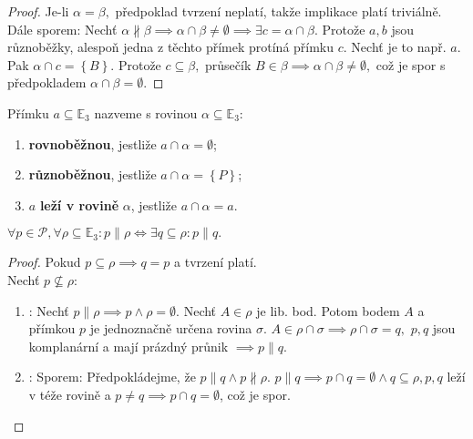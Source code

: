 \begin{proof}
    Je-li $\alpha = \beta,$ předpoklad tvrzení neplatí, takže implikace platí
    triviálně. \\
    Dále sporem: Nechť $\alpha \nparallel \beta \implies \alpha \cap \beta \ne
    \emptyset \implies \exists c = \alpha \cap \beta.$ Protože $a,b$ jsou různoběžky,
    alespoň jedna z těchto přímek protíná přímku $c.$ Nechť je to např. $a.$ Pak
    $\alpha \cap c = \left \{ B \right \} .$ Protože $c\subseteq \beta,$ průsečík
    $B\in \beta \implies \alpha \cap \beta \ne \emptyset,$ což je spor s předpokladem
    $\alpha \cap \beta = \emptyset.$
\end{proof}

\begin{definition}
    Přímku $a \subseteq \mathbb E_3$ nazveme s rovinou $\alpha \subseteq \mathbb E_3:$
    \begin{enumerate}[$i.$]
        \item \textbf{rovnoběžnou}, jestliže $a\cap \alpha = \emptyset$;
        \item \textbf{různoběžnou}, jestliže $a\cap \alpha = \left \{ P \right \} $;
        \item $a$ \textbf{leží v rovině} $\alpha$, jestliže $a \cap \alpha = a$.
    \end{enumerate}
\end{definition}

\begin{veta}
    $\forall p \in \mathscr P, \forall \rho \subseteq \mathbb E_3: p \parallel \rho
    \iff \exists q\subseteq \rho: p\parallel q.$
\end{veta}

\begin{proof}
    Pokud $p \subseteq \rho \implies q=p$ a tvrzení platí.\\
    Nechť $p\not \subseteq \rho:$
    \begin{enumerate}[$i.$]
        \item \uv{$\implies$}: Nechť $p\parallel\rho\implies p\land \rho=\emptyset.$
        Nechť $A\in\rho$ je lib. bod. Potom bodem $A$ a přímkou $p$ je jednoznačně
        určena rovina $\sigma.$ $A\in \rho\cap\sigma \implies \rho\cap\sigma=q,$
        $p,q$ jsou komplanární a mají prázdný průnik $\implies p\parallel q.$
        \item \uv{$\impliedby$}: Sporem: Předpokládejme, že $p\parallel q \land
        p\nparallel \rho.$ $p\parallel q \implies p\cap q=\emptyset\land q\subseteq \rho,
        p,q$ leží v téže rovině a $p\ne q\implies p\cap q = \emptyset$, což je spor.
    \end{enumerate}
\end{proof}

